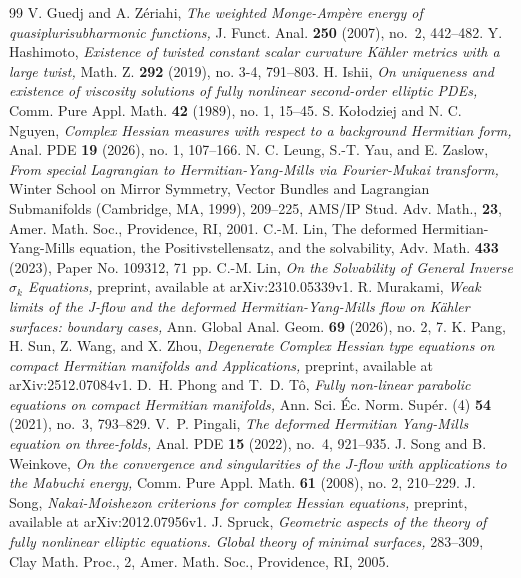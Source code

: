 \documentclass[10pt,a4paper]{amsart}
\numberwithin{equation}{section}
\begin{document}
\begin{thebibliography}{99}
 V. Guedj and A. Z\'eriahi, \textit{The weighted Monge-Amp\`ere energy of quasiplurisubharmonic functions,} J. Funct. Anal. {\bf 250} (2007), no.~2, 442--482.
 Y. Hashimoto, \textit{Existence of twisted constant scalar curvature K{\"a}hler metrics with a large twist,} Math. Z. \textbf{292} (2019), no. 3-4, 791--803.
 H. Ishii, \textit{On uniqueness and existence of viscosity solutions of fully nonlinear second-order elliptic PDEs,} Comm. Pure Appl. Math. \textbf{42} (1989), no. 1, 15--45.
 S. Kołodziej and N. C. Nguyen, \textit{Complex Hessian measures with respect to a background Hermitian form,} Anal. PDE \textbf{19} (2026), no. 1, 107--166.
 N. C. Leung, S.-T. Yau, and E. Zaslow, \textit{From special Lagrangian to Hermitian-Yang-Mills via Fourier-Mukai transform,} Winter School on Mirror Symmetry, Vector Bundles and Lagrangian Submanifolds (Cambridge, MA, 1999), 209--225, AMS/IP Stud. Adv. Math., \textbf{23}, Amer. Math. Soc., Providence, RI, 2001.
 C.-M. Lin, The deformed Hermitian-Yang-Mills equation, the Positivstellensatz, and the solvability, Adv. Math. {\bf 433} (2023), Paper No. 109312, 71 pp.
 C.-M. Lin, \textit{On the Solvability of General Inverse $\sigma_k$ Equations,} preprint, available at arXiv:2310.05339v1.
 R. Murakami, \textit{Weak limits of the J-flow and the deformed Hermitian-Yang-Mills flow on Kähler surfaces: boundary cases,} Ann. Global Anal. Geom. \textbf{69} (2026), no. 2, 7.
 K. Pang, H. Sun, Z. Wang, and X. Zhou, \textit{Degenerate Complex Hessian type equations on compact Hermitian manifolds and Applications,} preprint, available at arXiv:2512.07084v1.
 D.~H. Phong and T.~D. T\^o, \textit{Fully non-linear parabolic equations on compact Hermitian manifolds,} Ann. Sci. \'Ec. Norm. Sup\'er. (4) {\bf 54} (2021), no.~3, 793--829.
 V.~P. Pingali, \textit{The deformed Hermitian Yang-Mills equation on three-folds,} Anal. PDE {\bf 15} (2022), no.~4, 921--935.
 J. Song and B. Weinkove, \textit{On the convergence and singularities of the $J$-flow with applications to the Mabuchi energy,} Comm. Pure Appl. Math. \textbf{61} (2008), no. 2, 210--229.
 J. Song, \textit{Nakai-Moishezon criterions for complex Hessian equations,} preprint, available at arXiv:2012.07956v1.
 J. Spruck, \textit{Geometric aspects of the theory of fully nonlinear elliptic equations. Global theory of minimal surfaces,} 283--309, Clay Math. Proc., 2, Amer. Math. Soc., Providence, RI, 2005.

\end{thebibliography}
\end{document}
